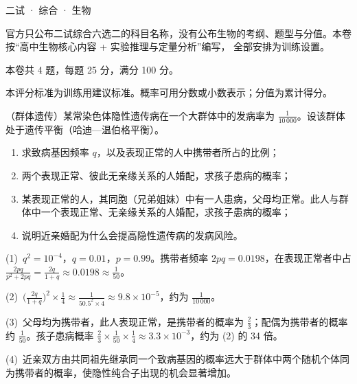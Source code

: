 \documentclass[cjk=noto, seal=first]{mojing-exam}
\begin{document}
\begin{paper}[time={建议 1.5 小时（训练设置）}, full=100]{二试 · 综合 · 生物}

\begin{instructions}
  \item 官方只公布二试综合六选二的科目名称，没有公布生物的考纲、题型与分值。本卷按“高中生物核心内容 + 实验推理与定量分析”编写，
        全部安排为训练设置。
  \item 本卷共 4 题，每题 25 分，满分 100 分。
\end{instructions}

\begin{gradingnotes}
  \item 本评分标准为训练用建议标准。概率可用分数或小数表示；分值为累计得分。
\end{gradingnotes}


\begin{questions}

\question[25]
（群体遗传）某常染色体隐性遗传病在一个大群体中的发病率为 $\frac1{10\,000}$。设该群体处于遗传平衡（哈迪—温伯格平衡）。
\begin{enumerate}
  \item 求致病基因频率 $q$，以及表现正常的人中携带者所占的比例；
  \item 两个表现正常、彼此无亲缘关系的人婚配，求孩子患病的概率；
  \item 某表现正常的人，其同胞（兄弟姐妹）中有一人患病，父母均正常。此人与群体中一个表现正常、无亲缘关系的人婚配，求孩子患病的概率；
  \item 说明近亲婚配为什么会提高隐性遗传病的发病风险。
\end{enumerate}
\answerspace{2cm}
\begin{solution}
(1)~$q^2=10^{-4}$，$q=0.01$，$p=0.99$。携带者频率 $2pq=0.0198$，在表现正常者中占 $\frac{2pq}{p^2+2pq}=\frac{2q}{1+q}\approx0.0198\approx\frac1{50}$。

(2)~$\bigl(\frac{2q}{1+q}\bigr)^2\times\frac14\approx\frac{1}{50.5^2\times4}\approx9.8\times10^{-5}$，约为 $\frac1{10\,000}$。

(3)~父母均为携带者，此人表现正常，是携带者的概率为 $\frac23$；配偶为携带者的概率约 $\frac1{50}$。孩子患病概率
$\frac23\times\frac{1}{50}\times\frac14\approx3.3\times10^{-3}$，约为 (2) 的 34 倍。

(4)~近亲双方由共同祖先继承同一个致病基因的概率远大于群体中两个随机个体同为携带者的概率，使隐性纯合子出现的机会显著增加。
\end{solution}


\end{questions}
\end{paper}
\end{document}
